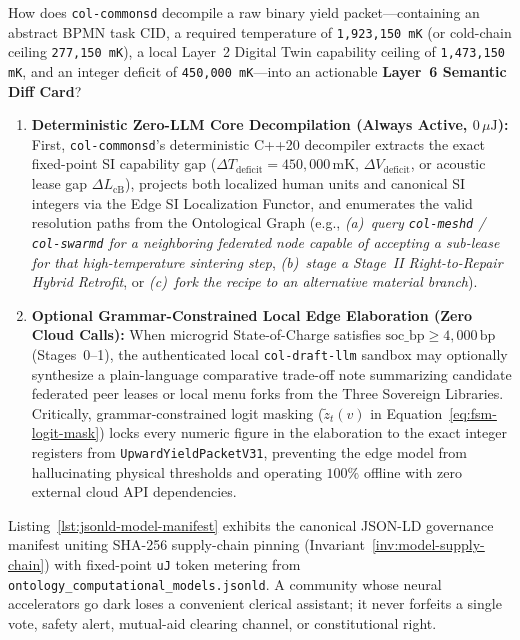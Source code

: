 How does \texttt{col-commonsd} decompile a raw binary yield packet---containing an abstract BPMN task CID, a required temperature of \texttt{1,923,150 mK} (or cold-chain ceiling \texttt{277,150 mK}), a local Layer~2 Digital Twin capability ceiling of \texttt{1,473,150 mK}, and an integer deficit of \texttt{450,000 mK}---into an actionable \textbf{Layer~6 Semantic Diff Card}?
\begin{enumerate}
  \item \textbf{Deterministic Zero-LLM Core Decompilation (Always Active, $0\,\mu\mathrm{J}$):} First, \texttt{col-commonsd}'s deterministic C++20 decompiler extracts the exact fixed-point SI capability gap ($\Delta T_{\mathrm{deficit}} = 450{,}000\,\mathrm{mK}$, $\Delta V_{\mathrm{deficit}}$, or acoustic lease gap $\Delta L_{\mathrm{cB}}$), projects both localized human units and canonical SI integers via the Edge SI Localization Functor, and enumerates the valid resolution paths from the Ontological Graph (e.g., \textit{(a)~query \texttt{col-meshd} / \texttt{col-swarmd} for a neighboring federated node capable of accepting a sub-lease for that high-temperature sintering step}, \textit{(b)~stage a Stage~II Right-to-Repair Hybrid Retrofit}, or \textit{(c)~fork the recipe to an alternative material branch}).
  \item \textbf{Optional Grammar-Constrained Local Edge Elaboration (Zero Cloud Calls):} When microgrid State-of-Charge satisfies $\mathrm{soc\_bp} \ge 4{,}000\,\mathrm{bp}$ (Stages~0--1), the authenticated local \texttt{col-draft-llm} sandbox may optionally synthesize a plain-language comparative trade-off note summarizing candidate federated peer leases or local menu forks from the Three Sovereign Libraries. Critically, grammar-constrained logit masking ($\tilde{z}_t(v)$ in Equation~\ref{eq:fsm-logit-mask}) locks every numeric figure in the elaboration to the exact integer registers from \texttt{UpwardYieldPacketV31}, preventing the edge model from hallucinating physical thresholds and operating $100\%$ offline with zero external cloud API dependencies.
\end{enumerate}

Listing~\ref{lst:jsonld-model-manifest} exhibits the canonical JSON-LD governance manifest uniting SHA-256 supply-chain pinning (Invariant~\ref{inv:model-supply-chain}) with fixed-point \texttt{uJ} token metering from \texttt{ontology\_computational\_models.jsonld}. A community whose neural accelerators go dark loses a convenient clerical assistant; it never forfeits a single vote, safety alert, mutual-aid clearing channel, or constitutional right.


